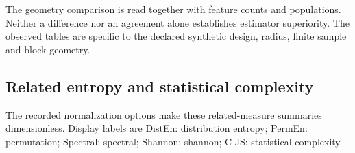 \documentclass[
  english,
  11pt,
]{article}
\begin{document}
The geometry comparison is read together with feature counts and
populations. Neither a difference nor an agreement alone establishes
estimator superiority. The observed tables are specific to the declared
synthetic design, radius, finite sample and block geometry.

\subsection{Related entropy and statistical
complexity}\label{related-entropy-and-statistical-complexity}

The recorded normalization options make these related-measure summaries
dimensionless. Display labels are DistEn: distribution entropy; PermEn:
permutation; Spectral: spectral; Shannon: shannon; C-JS: statistical
complexity.
\end{document}
